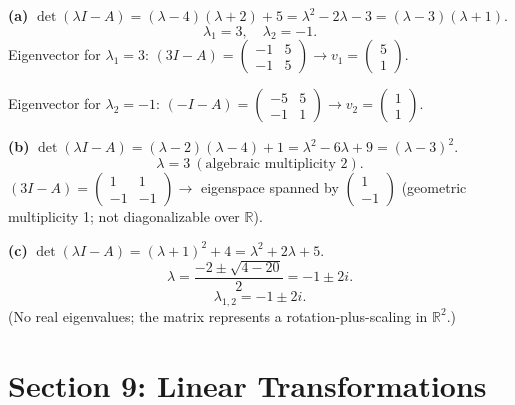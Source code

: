 \begin{solution}
\textbf{(a)} $\det(\lambda I-A)=(\lambda-4)(\lambda+2)+5=\lambda^2-2\lambda-3=(\lambda-3)(\lambda+1)$.
\[
\boxed{\lambda_1=3,\quad\lambda_2=-1.}
\]
Eigenvector for $\lambda_1=3$: $(3I-A)=\begin{pmatrix}-1&5\\-1&5\end{pmatrix}\to v_1=\begin{pmatrix}5\\1\end{pmatrix}$.

Eigenvector for $\lambda_2=-1$: $(-I-A)=\begin{pmatrix}-5&5\\-1&1\end{pmatrix}\to v_2=\begin{pmatrix}1\\1\end{pmatrix}$.

\textbf{(b)} $\det(\lambda I-A)=(\lambda-2)(\lambda-4)+1=\lambda^2-6\lambda+9=(\lambda-3)^2$.
\[
\boxed{\lambda=3\ (\text{algebraic multiplicity }2).}
\]
$(3I-A)=\begin{pmatrix}1&1\\-1&-1\end{pmatrix}\to$ eigenspace spanned by $\begin{pmatrix}1\\-1\end{pmatrix}$ (geometric multiplicity 1; not diagonalizable over $\mathbb{R}$).

\textbf{(c)} $\det(\lambda I-A)=(\lambda+1)^2+4=\lambda^2+2\lambda+5$.
\[
\lambda=\frac{-2\pm\sqrt{4-20}}{2}=-1\pm 2i.
\]
\[
\boxed{\lambda_{1,2}=-1\pm 2i.}
\]
(No real eigenvalues; the matrix represents a rotation-plus-scaling in $\mathbb{R}^2$.)
\end{solution}

\clearpage
\section*{Section 9: Linear Transformations}

